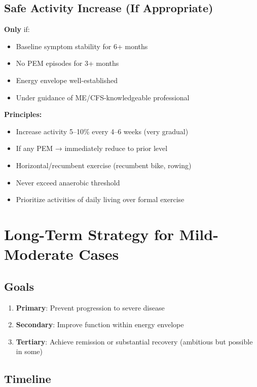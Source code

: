 \subsection{Safe Activity Increase (If Appropriate)}

\textbf{Only} if:
\begin{itemize}
    \item Baseline symptom stability for 6+ months
    \item No PEM episodes for 3+ months
    \item Energy envelope well-established
    \item Under guidance of ME/CFS-knowledgeable professional
\end{itemize}

\textbf{Principles:}
\begin{itemize}
    \item Increase activity 5--10\% every 4--6 weeks (very gradual)
    \item If any PEM → immediately reduce to prior level
    \item Horizontal/recumbent exercise (recumbent bike, rowing)
    \item Never exceed anaerobic threshold
    \item Prioritize activities of daily living over formal exercise
\end{itemize}

\section{Long-Term Strategy for Mild-Moderate Cases}
\label{sec:long-term-mild-moderate}

\subsection{Goals}

\begin{enumerate}
    \item \textbf{Primary}: Prevent progression to severe disease
    \item \textbf{Secondary}: Improve function within energy envelope
    \item \textbf{Tertiary}: Achieve remission or substantial recovery (ambitious but possible in some)
\end{enumerate}

\subsection{Timeline}


